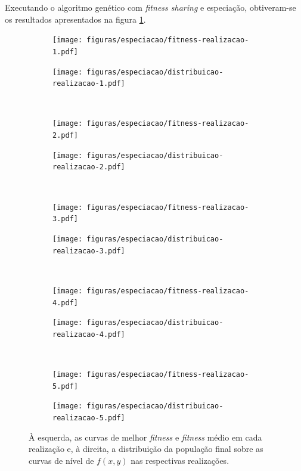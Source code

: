 \documentclass[a4paper, 12pt]{article}
\newcommand{\fitness}{\textit{fitness}\xspace}
\newcommand{\fitsha}{\textit{fitness sharing}\xspace}
\begin{document}
Executando o algoritmo genético com \fitsha e especiação, obtiveram-se os resultados apresentados na figura \ref{fig:fitness-distribuicao-sharing-especiacao}.
\begin{figure}[!ht]
    \centering
    \begin{subfigure}{0.4\textwidth}
        \texttt{[image: figuras/especiacao/fitness-realizacao-1.pdf]}
    \end{subfigure}
    \begin{subfigure}{0.4\textwidth}
        \texttt{[image: figuras/especiacao/distribuicao-realizacao-1.pdf]}
    \end{subfigure}
    \hfill
    \\
    \centering
    \begin{subfigure}{0.4\textwidth}
        \texttt{[image: figuras/especiacao/fitness-realizacao-2.pdf]}
    \end{subfigure}
    \begin{subfigure}{0.4\textwidth}
        \texttt{[image: figuras/especiacao/distribuicao-realizacao-2.pdf]}
    \end{subfigure}
    \hfill
    \\
    \centering
    \begin{subfigure}{0.4\textwidth}
        \texttt{[image: figuras/especiacao/fitness-realizacao-3.pdf]}
    \end{subfigure}
    \begin{subfigure}{0.4\textwidth}
        \texttt{[image: figuras/especiacao/distribuicao-realizacao-3.pdf]}
    \end{subfigure}
    \hfill
    \\
    \centering
    \begin{subfigure}{0.4\textwidth}
        \texttt{[image: figuras/especiacao/fitness-realizacao-4.pdf]}
    \end{subfigure}
    \begin{subfigure}{0.4\textwidth}
        \texttt{[image: figuras/especiacao/distribuicao-realizacao-4.pdf]}
    \end{subfigure}
    \hfill
    \\
    \centering
    \begin{subfigure}{0.4\textwidth}
        \texttt{[image: figuras/especiacao/fitness-realizacao-5.pdf]}
    \end{subfigure}
    \begin{subfigure}{0.4\textwidth}
        \texttt{[image: figuras/especiacao/distribuicao-realizacao-5.pdf]}
    \end{subfigure}
    \hfill
    \caption{À esquerda, as curvas de melhor \fitness e \fitness médio em cada realização e, à direita, a distribuição da população final sobre as curvas de nível de $f(x, y)$ nas respectivas realizações.}
    \label{fig:fitness-distribuicao-sharing-especiacao}
\end{figure}


\clearpage





 
\end{document}
